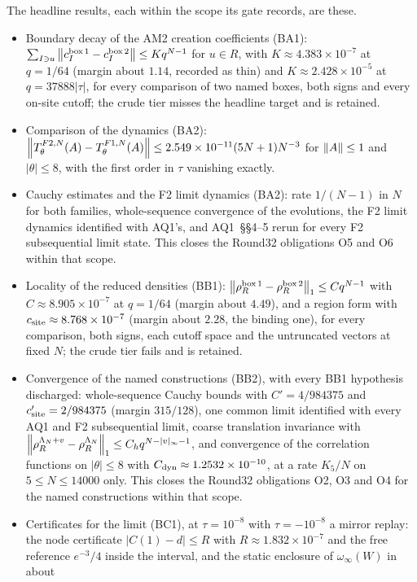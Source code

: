 \documentclass[11pt,a4paper]{article}
\begin{document}
The headline results, each within the scope its gate records, are these.
\begin{itemize}
\item Boundary decay of the AM2 creation coefficients (BA1):
 $\sum_{I\ni u}\left\lVert c^{\rm box\,1}_I-c^{\rm box\,2}_I\right\rVert\le Kq^{N-1}$ for $u\in R$,
 with $K\approx4.383\times10^{-7}$ at $q=1/64$ (margin about $1.14$, recorded
 as thin) and $K\approx2.428\times10^{-5}$ at $q=37888|\tau|$, for every
 comparison of two named boxes, both signs and every on-site cutoff; the
 crude tier misses the headline target and is retained.
\item Comparison of the dynamics (BA2):
 $\left\lVert T^{F2,N}_\theta(A)-T^{F1,N}_\theta(A)\right\rVert\le2.549\times10^{-11}(5N+1)N^{-3}$
 for $\left\lVert A\right\rVert\le1$ and $|\theta|\le8$, with the first order in $\tau$
 vanishing exactly.
\item Cauchy estimates and the F2 limit dynamics (BA2): rate $1/(N-1)$ in $N$
 for both families, whole-sequence convergence of the evolutions, the F2
 limit dynamics identified with AQ1's, and AQ1~\S\S4--5 rerun for every F2
 subsequential limit state. This closes the Round32 obligations O5 and O6
 within that scope.
\item Locality of the reduced densities (BB1):
 $\left\lVert\rho^{\rm box\,1}_R-\rho^{\rm box\,2}_R\right\rVert_1\le Cq^{N-1}$ with
 $C\approx8.905\times10^{-7}$ at $q=1/64$ (margin about $4.49$), and a region
 form with $c_{\rm site}\approx8.768\times10^{-7}$ (margin about $2.28$, the
 binding one), for every comparison, both signs, each cutoff space and the
 untruncated vectors at fixed $N$; the crude tier fails and is retained.
\item Convergence of the named constructions (BB2), with every BB1 hypothesis
 discharged: whole-sequence Cauchy bounds with $C'=4/984375$ and
 $c'_{\rm site}=2/984375$ (margin $315/128$), one common limit identified with
 every AQ1 and F2 subsequential limit, coarse translation invariance with
 $\left\lVert\rho^{\Lambda_N+v}_R-\rho^{\Lambda_N}_R\right\rVert_1\le C_hq^{N-|v|_\infty-1}$,
 and convergence of the correlation functions on $|\theta|\le8$ with
 $C_{\rm dyn}\approx1.2532\times10^{-10}$, at a rate $K_5/N$ on
 $5\le N\le14000$ only. This closes the Round32 obligations O2, O3 and O4 for
 the named constructions within that scope.
\item Certificates for the limit (BC1), at $\tau=10^{-8}$ with
 $\tau=-10^{-8}$ a mirror replay: the node certificate $|C(1)-d|\le R$
 with $R\approx1.832\times10^{-7}$ and the free reference $e^{-3}/4$ inside the
 interval, and the static enclosure of $\omega_\infty(W)$ in about

\end{itemize}
\end{document}
